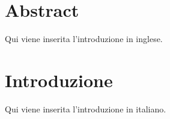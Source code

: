 \chapter{Abstract}
Qui viene inserita l'introduzione in inglese.

\chapter{Introduzione}
Qui viene inserita l'introduzione in italiano.